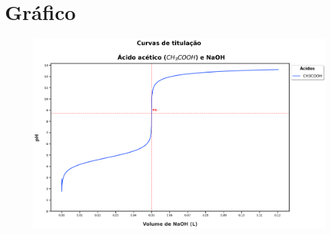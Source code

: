 \documentclass[a4paper, 12pt]{article}
\begin{document}
%
%

\section{Gráfico}

\begin{figure}[H]
	\centering
	\includegraphics[width=0.99\linewidth]{../curva_de_titulacao_ac_acetico}
	\caption[Curva de titulação]{}
	\label{fig:curvadetitulacaoacacetico}
\end{figure}
\end{document}
